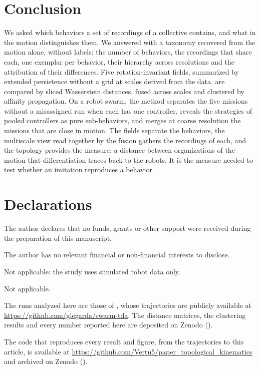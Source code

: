 \documentclass[pdflatex,sn-apa]{sn-jnl}
\begin{document}
\section{Conclusion}
\label{sec:conclusion}

We asked which behaviors a set of recordings of a collective contains, and what in the motion distinguishes them. We
answered with a taxonomy recovered from the motion alone, without labels: the number of behaviors, the recordings that
share each, one exemplar per behavior, their hierarchy across resolutions and the attribution of their differences.
Five rotation-invariant fields, summarized by extended persistence without a grid at scales derived from the data, are
compared by sliced Wasserstein distances, fused across scales and clustered by affinity propagation. On a robot swarm,
the method separates the five missions without a misassigned run when each has one controller, reveals the strategies
of pooled controllers as pure sub-behaviors, and merges at coarse resolution the missions that are close in motion. The
fields separate the behaviors, the multiscale view read together by the fusion gathers the recordings of each, and the
topology provides the measure: a distance between organizations of the motion that differentiation traces back to the
robots. It is the measure needed to test whether an imitation reproduces a behavior.

\FloatBarrier
\section*{Declarations}

 The author declares that no funds, grants or other support were received during the preparation of
this manuscript.

 The author has no relevant financial or non-financial interests to disclose.

 Not applicable: the study uses simulated robot data only.

 Not applicable.

 The runs analyzed here are those of \citet{legarda2026universal}, whose trajectories are
publicly available at \url{https://github.com/glegarda/swarm-tda}. The distance matrices, the clustering results and
every number reported here are deposited on Zenodo ().

 The code that reproduces every result and figure, from the trajectories to this article,
is available at \url{https://github.com/Vertu5/paper_topological_kinematics} and archived on Zenodo
().
\end{document}
